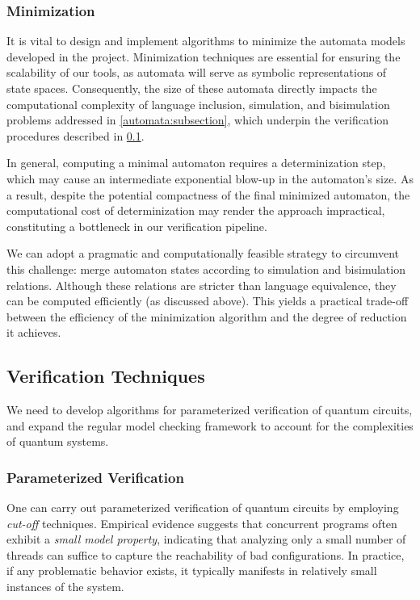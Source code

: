 \subsubsection{Minimization}
It is vital to design and implement algorithms to minimize the automata models developed in the project.
%
Minimization techniques are essential for ensuring the scalability of our tools, as automata will serve as symbolic representations of state spaces. Consequently, the size of these automata directly impacts the computational complexity of language inclusion, simulation, and bisimulation problems addressed in \cref{automata:subsection}, which underpin the verification procedures described in \cref{verification:subsection}.
%

In general, computing a minimal automaton requires a determinization step, which may cause an intermediate exponential blow-up in the automaton's size.
%
As a result, despite the potential compactness of the final minimized automaton, the computational cost of determinization may render the approach impractical, constituting a bottleneck in our verification pipeline.
%

We can adopt a pragmatic and computationally feasible strategy to circumvent this challenge: merge automaton states according to simulation and bisimulation relations.
%
Although these relations are stricter than language equivalence, they can be computed efficiently (as discussed above).
%
This yields a practical trade-off between the efficiency of the minimization algorithm and the degree of reduction it achieves.
%

\subsection{Verification Techniques}
\label{verification:subsection}

We need to develop algorithms for parameterized verification of quantum circuits, and expand the regular model checking framework to account for the complexities of quantum systems.

\subsubsection{Parameterized Verification}
One can carry out parameterized verification of quantum circuits by employing \emph{cut-off} techniques.
Empirical evidence suggests that concurrent programs often exhibit a \emph{small model property}, indicating that analyzing only a small number of threads can suffice to capture the reachability of bad configurations.
In practice, if any problematic behavior exists, it typically manifests in relatively small instances of the system.

